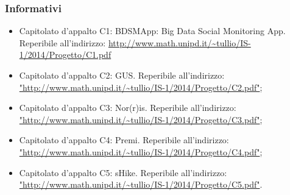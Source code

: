 \subsubsection{Informativi}
\begin{itemize}
	\item Capitolato d’appalto C1: BDSMApp: Big Data Social Monitoring App. Reperibile all'indirizzo:  \url{http://www.math.unipd.it/~tullio/IS-1/2014/Progetto/C1.pdf}
	\item Capitolato d’appalto C2: GUS. Reperibile all'indirizzo: \url{"http://www.math.unipd.it/~tullio/IS-1/2014/Progetto/C2.pdf"};
	\item Capitolato d’appalto C3: Nor(r)is. Reperibile all'indirizzo: \url{"http://www.math.unipd.it/~tullio/IS-1/2014/Progetto/C3.pdf"};
	\item Capitolato d’appalto C4: Premi. Reperibile all'indirizzo: \url{"http://www.math.unipd.it/~tullio/IS-1/2014/Progetto/C4.pdf"};
	\item Capitolato d’appalto C5: sHike. Reperibile all'indirizzo: \url{"http://www.math.unipd.it/~tullio/IS-1/2014/Progetto/C5.pdf"}.
\end{itemize}
